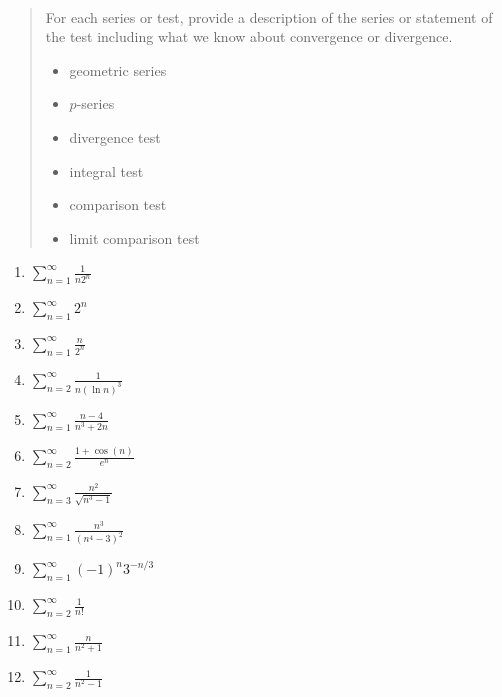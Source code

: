 \documentclass[11pt]{amsart}
\begin{document}
\begin{center}
  \large
  \\
   
\end{center}


\thispagestyle{empty}
\begin{quote}
For each series or test, provide a description of the series or statement  of the test including what we know about convergence or divergence.
    \begin{itemize}
    \item geometric series
    \vfill
    \item $p$-series
     \vfill
    \item divergence test
     \vfill
    \item integral test
     \vfill
    \item comparison test
     \vfill
    \item limit comparison test
     \vfill
    \end{itemize}

\end{quote}
\newpage
\medskip
\renewcommand{\labelenumi}{\textbf{\Alph{enumi}.}}
\begin{enumerate}
\setlength\itemsep{19mm}
\item   \qquad $\displaystyle \sum_{n=1}^\infty \frac{1}{n2^n}$
\vfill
\item   \qquad $\displaystyle \sum_{n=1}^\infty 2^{n}$
\vfill
\item   \qquad $\displaystyle \sum_{n=1}^\infty \frac{n}{2^n}$
\vfill
\item   \qquad $\displaystyle \sum_{n=2}^\infty \frac{1}{n (\ln n)^3}$
\vfill
\newpage
\item   \qquad $\displaystyle \sum_{n=1}^\infty \frac{n-4}{n^3+2n}$
\vfill
\item   \qquad $\displaystyle \sum_{n=2}^\infty \frac{1+\cos(n)}{e^n}$
\vfill
\item   \qquad $\displaystyle \sum_{n=3}^\infty \frac{n^2}{\sqrt{n^3-1}}$
\vfill
\item   \qquad $\displaystyle \sum_{n=1}^\infty \frac{n^3}{(n^4-3)^2}$
\vfill
\newpage
\item   \qquad $\displaystyle \sum_{n=1}^\infty (-1)^n 3^{-n/3}$
\vfill

\item   \qquad $\displaystyle \sum_{n=2}^\infty \frac{1}{n!}$
\vfill

\item   \qquad $\displaystyle \sum_{n=1}^\infty \frac{n}{n^2+1}$
\vfill

\item   \qquad $\displaystyle \sum_{n=2}^\infty \frac{1}{n^2-1}$
\vfill
\newpage
\end{enumerate}
\end{document}
